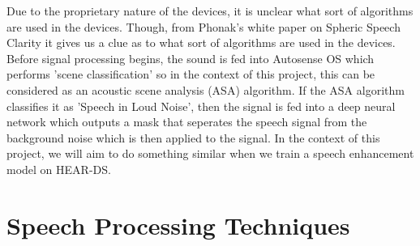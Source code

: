\documentclass[logo,bsc,singlespacing,parskip,online]{infthesis}
\begin{document}
Due to the proprietary nature of the devices, it is unclear what sort of 
algorithms are used in the devices. Though, from Phonak's white paper on Spheric Speech Clarity \cite{Hasemann2024PhonakSphere}
it gives us a clue as to what sort of algorithms are used in the devices.
Before signal processing begins, the sound is fed into Autosense OS which 
performs 'scene classification' so in the context of this project, this can be 
considered as an acoustic scene analysis (ASA) algorithm. If the ASA algorithm 
classifies it as 'Speech in Loud Noise', then the signal is fed into a 
deep neural network which outputs a mask that seperates the speech signal from the background noise 
which is then applied to the signal. In the context of this project, we will aim to do something similar 
when we train a speech enhancement model on HEAR-DS.



\section{Speech Processing Techniques}
\end{document}
